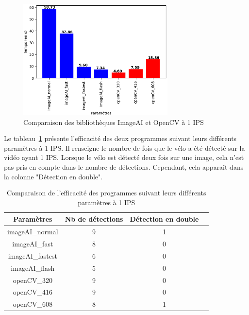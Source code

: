 \begin{figure}[H]
    \centering
    \includegraphics[width=0.7\textwidth]{img/result_1fps.png}
    \caption{Comparaison des bibliothèques ImageAI et OpenCV à 1 IPS}
\end{figure}

Le tableau~\ref{tab_1fps} présente l'efficacité des deux programmes suivant leurs différents paramètres à 1 IPS.
Il renseigne le nombre de fois que le vélo a été détecté sur la vidéo ayant 1 IPS.
Lorsque le vélo est détecté deux fois sur une image, cela n'est pas pris en compte dans le nombre de détections.
Cependant, cela apparaît dans la colonne "Détection en double".

\begin{table}[H]
    \centering
    \begin{tabular}{|c|c|c|c|}
        \hline
        \rowcolor{tableColorDark} Paramètres & Nb de détections & Détection en double \\
        \hline

        imageAI\_normal                      & 9                & 1                   \\\hline
        imageAI\_fast                        & 8                & 0                   \\\hline
        imageAI\_fastest                     & 6                & 0                   \\\hline
        imageAI\_flash                       & 5                & 0                   \\\hline
        openCV\_320                          & 9                & 0                   \\\hline
        openCV\_416                          & 9                & 0                   \\\hline
        openCV\_608                          & 8                & 1                   \\\hline
    \end{tabular}
    \caption{Comparaison de l'efficacité des programmes suivant leurs différents paramètres à 1 IPS}
    \label{tab_1fps}
\end{table}

